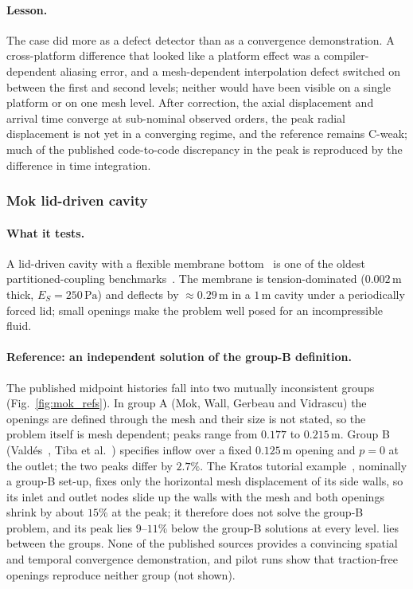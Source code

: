 \paragraph{Lesson.}
The case did more as a defect detector than as a convergence demonstration.
A cross-platform difference that looked like a platform effect was a compiler-dependent aliasing error, and a mesh-dependent interpolation defect switched on between the first and second levels; neither would have been visible on a single platform or on one mesh level.
After correction, the axial displacement and arrival time converge at sub-nominal observed orders, the peak radial displacement is not yet in a converging regime, and the reference remains C-weak; much of the published code-to-code discrepancy in the peak is reproduced by the difference in time integration.

\subsubsection{Mok lid-driven cavity}\label{sec:mok}

\paragraph{What it tests.}
A lid-driven cavity with a flexible membrane bottom~\citep{Wall1999, Mok2001, MokWallRamm2001} is one of the oldest partitioned-coupling benchmarks~\citep{Gerbeau2003, kuttler2008fixed, Kassiotis2011}.
The membrane is tension-dominated ($0.002\,\mathrm{m}$ thick, $E_S = 250\,\mathrm{Pa}$) and deflects by $\approx0.29\,\mathrm{m}$ in a $1\,\mathrm{m}$ cavity under a periodically forced lid; small openings make the problem well posed for an incompressible fluid.

\paragraph{Reference: an independent solution of the group-B definition.}
The published midpoint histories fall into two mutually inconsistent groups (Fig.~\ref{fig:mok_refs}).
In group A (Mok, Wall, Gerbeau and Vidrascu) the openings are defined through the mesh and their size is not stated, so the problem itself is mesh dependent; peaks range from $0.177$ to $0.215\,\mathrm{m}$.
Group B (Vald\'es~\citep{Valdes2007}, Tiba et al.~\citep{Tiba2026}) specifies inflow over a fixed $0.125\,\mathrm{m}$ opening and $p = 0$ at the outlet; the two peaks differ by $2.7\%$.
The Kratos tutorial example~\citep{KratosLDC}, nominally a group-B set-up, fixes only the horizontal mesh displacement of its side walls, so its inlet and outlet nodes slide up the walls with the mesh and both openings shrink by about $15\%$ at the peak; it therefore does not solve the group-B problem, and its peak lies $9$--$11\%$ below the group-B solutions at every level.
\citet{Kassiotis2011} lies between the groups.
None of the published sources provides a convincing spatial and temporal convergence demonstration, and pilot runs show that traction-free openings reproduce neither group (not shown).

